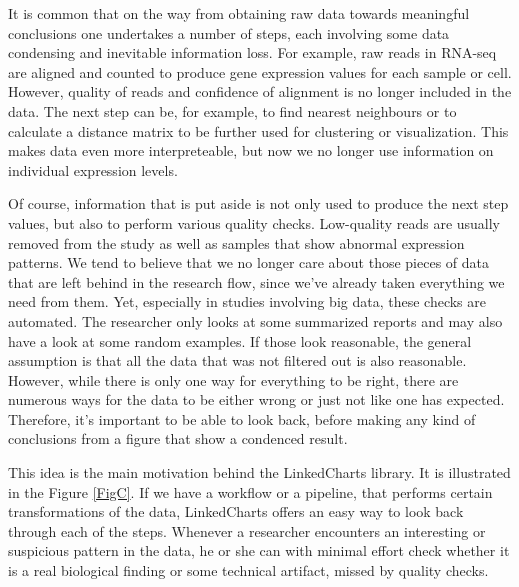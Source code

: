 \documentclass[twocolumn,10pt]{article}
\begin{document}
It is common that on the way from obtaining raw data towards meaningful conclusions one undertakes a number of steps, each involving some data condensing and inevitable information loss. For example, raw reads in RNA-seq are aligned and counted to produce gene expression values for each sample or cell. However, quality of reads and confidence of alignment is no longer included in the data. The next step can be, for example, to find nearest neighbours or to calculate a distance matrix to be further used for clustering or visualization. This makes data even more interpreteable, but now we no longer use information on individual expression levels. 

Of course, information that is put aside is not only used to produce the next step values, but also to perform various quality checks. Low-quality reads are usually removed from the study as well as samples that show abnormal expression patterns. We tend to believe that we no longer care about those pieces of data that are left behind in the research flow, since we've already taken everything we need from them. Yet, especially in studies involving big data, these checks are automated. The researcher only looks at some summarized reports and may also have a look at some random examples. If those look reasonable, the general assumption is that all the data that was not filtered out is also reasonable. However, while there is only one way for everything to be right, there are numerous ways for the data to be either wrong or just not like one has expected. Therefore, it's important to be able to look back, before making any kind of conclusions from a figure that show a condenced result.

This idea is the main motivation behind the LinkedCharts library. It is illustrated in the Figure \ref{FigC}. If we have a workflow or a pipeline, that performs certain transformations of the data, LinkedCharts offers an easy way to look back through each of the steps. Whenever a researcher encounters an interesting or suspicious pattern in the data, he or she can with minimal effort check  whether it is a real biological finding or some technical artifact, missed by quality checks. 
\end{document}
